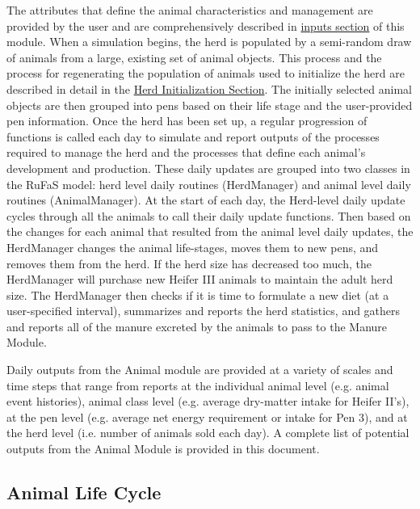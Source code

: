 \documentclass{article}
\begin{document}
\begin{refsection}
The attributes that define the animal characteristics and management are provided by the user and are comprehensively described in \hyperref[sec:animalINPUTS]{inputs section} of this module. When a simulation begins, the herd is populated by a semi-random draw of animals from a large, existing set of animal objects. This process and the process for regenerating the population of animals used to initialize the herd are described in detail in the \hyperref[herdinit]{Herd Initialization Section}. The initially selected animal objects are then grouped into pens based on their life stage and the user-provided pen information. Once the herd has been set up, a regular progression of functions is called each day to simulate and report outputs of the processes required to manage the herd and the processes that define each animal’s development and production. These daily updates are grouped into two classes in the RuFaS model: herd level daily routines (HerdManager) and animal level daily routines (AnimalManager). At the start of each day, the Herd-level daily update cycles through all the animals to call their daily update functions. Then based on the changes for each animal that resulted from the animal level daily updates, the HerdManager changes the animal life-stages, moves them to new pens, and removes them from the herd. If the herd size has decreased too much, the HerdManager will purchase new Heifer III animals to maintain the adult herd size. The HerdManager then checks if it is time to formulate a new diet (at a user-specified interval), summarizes and reports the herd statistics, and gathers and reports all of the manure excreted by the animals to pass to the Manure Module. 

Daily outputs from the Animal module are provided at a variety of scales and time steps that range from reports at the individual animal level (e.g. animal event histories), animal class level (e.g. average dry-matter intake for Heifer II’s), at the pen level (e.g. average net energy requirement or intake for Pen 3), and at the herd level (i.e. number of animals sold each day). A complete list of potential outputs from the Animal Module is provided in this document.
\vspace{1cm}


\subsection{Animal Life Cycle}
\vspace{0.2cm}


\end{refsection}
\end{document}
